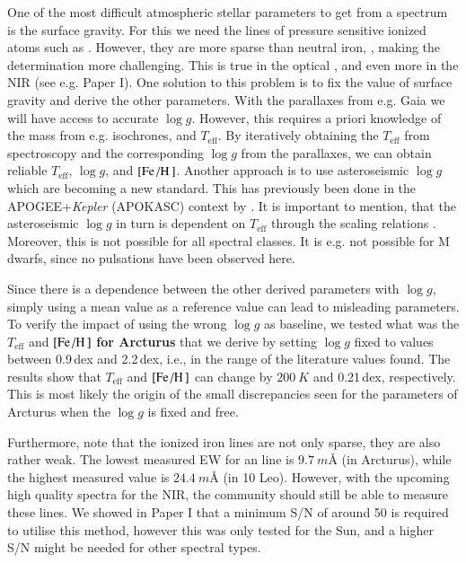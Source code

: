 \documentclass{aa}
\begin{document}
One of the most difficult atmospheric stellar parameters to get from a spectrum
is the surface gravity. For this we need the lines of pressure sensitive ionized
atoms such as . However, they are more sparse than neutral iron,
, making the determination more challenging. This is true in the
optical \citep[see e.g. the discussion by][]{Mortier2013c}, and even more in the
NIR (see e.g. Paper I). One solution to this problem is to fix the value of
surface gravity and derive the other parameters. With the parallaxes from e.g.
Gaia \citep{GAIA} we will have access to accurate $\log g$. However, this
requires a priori knowledge of the mass from e.g. isochrones, and
$T_\mathrm{eff}$. By iteratively obtaining the $T_\mathrm{eff}$ from
spectroscopy and the corresponding $\log g$ from the parallaxes, we can obtain
reliable $T_\mathrm{eff}$, $\log g$, and $[\ion{Fe}/\ion{H}]$. Another
approach is to use asteroseismic $\log g$ which are becoming a new standard.
This has previously been done in the APOGEE+\emph{Kepler} (APOKASC) context by
\citet{Pinsonneault2014,Hawkins2016}. It is important to mention, that the
asteroseismic $\log g$ in turn is dependent on $T_\mathrm{eff}$ through the
scaling relations \citep[see e.g.][]{Kjeldsen1995}. Moreover, this is not
possible for all spectral classes. It is e.g. not possible for M dwarfs, since
no pulsations have been observed here.

Since there is a dependence between the other derived parameters with $\log g$,
simply using a mean value as a reference value can lead to misleading
parameters. To verify the impact of using the wrong $\log g$ as baseline, we
tested what was the $T_\mathrm{eff}$ and $[\ion{Fe}/\ion{H}]$ {\bf for Arcturus} that we derive by
setting $\log g$ fixed to values between 0.9\,dex and 2.2\,dex, i.e., in the
range of the literature values found. The results show that $T_\mathrm{eff}$ and
$[\ion{Fe}/\ion{H}]$ can change by $\SI{200}{K}$ and 0.21\,dex, respectively.
This is most likely the origin of the small discrepancies seen for the
parameters of Arcturus when the $\log g$ is fixed and free.

Furthermore, note that the ionized iron lines are not only sparse, they are also
rather weak. The lowest measured EW for an  line is
$\SI{9.7}{m}$\AA{} (in Arcturus), while the highest measured value is
$\SI{24.4}{m}$\AA{} (in 10 Leo). However, with the upcoming high quality spectra
for the NIR, the community should still be able to measure these 
lines. We showed in Paper I that a minimum S/N of around 50 is required to
utilise this method, however this was only tested for the Sun, and a higher S/N
might be needed for other spectral types.
\end{document}
